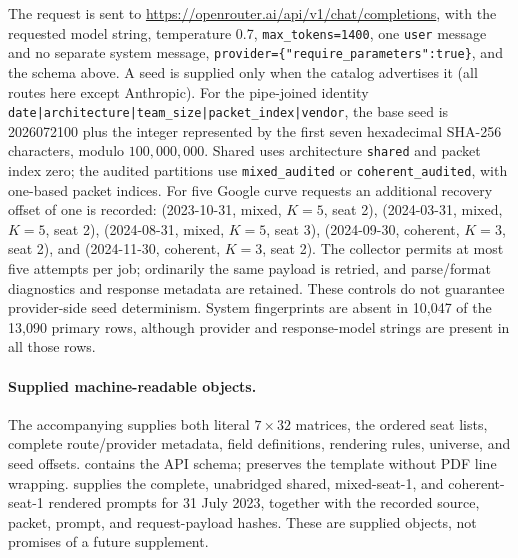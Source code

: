 The request is sent to
\url{https://openrouter.ai/api/v1/chat/completions}, with the requested
model string, temperature 0.7, \texttt{max\_tokens=1400}, one
\texttt{user} message and no separate system message,
\texttt{provider=\{"require\_parameters":true\}}, and the schema above.
A seed is supplied only when the catalog advertises it (all routes here
except Anthropic). For the pipe-joined identity
\texttt{date|architecture|team\_size|packet\_index|vendor}, the base seed is
2026072100 plus the integer represented by the first seven hexadecimal
SHA-256 characters, modulo $100{,}000{,}000$.
Shared uses architecture \texttt{shared} and packet index zero;
the audited partitions use \texttt{mixed\_audited} or
\texttt{coherent\_audited}, with one-based packet indices.
For five Google curve requests an additional recovery offset of one is
recorded: (2023-10-31, mixed, $K=5$, seat 2), (2024-03-31, mixed, $K=5$,
seat 2), (2024-08-31, mixed, $K=5$, seat 3), (2024-09-30, coherent, $K=3$,
seat 2), and (2024-11-30, coherent, $K=3$, seat 2).
The collector permits at most five attempts per job; ordinarily the
same payload is retried, and parse/format diagnostics and response
metadata are retained. These controls do not guarantee provider-side
seed determinism. System fingerprints are absent in 10,047 of the
13,090 primary rows, although provider and response-model strings are
present in all those rows.

\paragraph{Supplied machine-readable objects.}
The accompanying  supplies both literal
$7\times32$ matrices, the ordered seat lists, complete route/provider
metadata, field definitions, rendering rules, universe, and seed offsets.
 contains the API schema;
 preserves the template without
PDF line wrapping.  supplies the
complete, unabridged shared, mixed-seat-1, and coherent-seat-1 rendered
prompts for 31 July 2023, together with the recorded source, packet,
prompt, and request-payload hashes. These are supplied objects, not
promises of a future supplement.
